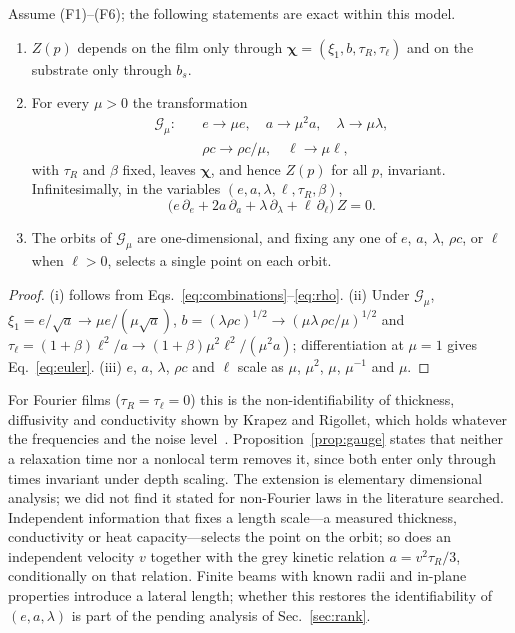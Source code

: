 \begin{proposition}\label{prop:gauge}
Assume (F1)--(F6); the following statements are exact within this model.
\begin{enumerate}
\item[(i)] $Z(p)$ depends on the film only through $\bm\chi=(\xi_1,b,\tau_R,\tau_\ell)$ and on the
substrate only through $b_s$.
\item[(ii)] For every $\mu>0$ the transformation
\begin{equation}
\begin{aligned}
\mathcal G_\mu:\quad &e\to\mu e,\quad a\to\mu^2a,\quad \lambda\to\mu\lambda,\\
&\rho c\to\rho c/\mu,\quad \ell\to\mu\ell,
\end{aligned}
\label{eq:gaugegroup}
\end{equation}
with $\tau_R$ and $\beta$ fixed, leaves $\bm\chi$, and hence $Z(p)$ for all $p$, invariant.
Infinitesimally, in the variables $(e,a,\lambda,\ell,\tau_R,\beta)$,
\begin{equation}
\big(e\,\partial_e+2a\,\partial_a+\lambda\,\partial_\lambda+\ell\,\partial_\ell\big)\,Z=0 .
\label{eq:euler}
\end{equation}
\item[(iii)] The orbits of $\mathcal G_\mu$ are one-dimensional, and fixing any one of $e$, $a$,
$\lambda$, $\rho c$, or $\ell$ when $\ell>0$, selects a single point on each orbit.
\end{enumerate}
\end{proposition}

\begin{proof}
(i) follows from Eqs.~\eqref{eq:combinations}--\eqref{eq:rho}. (ii) Under $\mathcal G_\mu$,
$\xi_1=e/\sqrt a\to\mu e/(\mu\sqrt a)$, $b=(\lambda\rho c)^{1/2}\to(\mu\lambda\,\rho c/\mu)^{1/2}$ and
$\tau_\ell=(1+\beta)\ell^2/a\to(1+\beta)\mu^2\ell^2/(\mu^2a)$; differentiation at $\mu=1$ gives
Eq.~\eqref{eq:euler}. (iii) $e$, $a$, $\lambda$, $\rho c$ and $\ell$ scale as $\mu$, $\mu^2$, $\mu$,
$\mu^{-1}$ and $\mu$.
\end{proof}

For Fourier films ($\tau_R=\tau_\ell=0$) this is the non-identifiability of thickness, diffusivity and
conductivity shown by Krapez and Rigollet, which holds whatever the frequencies and the noise
level~\cite{KrapezRigollet2017}. Proposition~\ref{prop:gauge} states that neither a relaxation time nor a
nonlocal term removes it, since both enter only through times invariant under depth scaling. The
extension is elementary dimensional analysis; we did not find it stated for non-Fourier laws in the
literature searched. Independent information that fixes a length scale---a measured thickness,
conductivity or heat capacity---selects the point on the orbit; so does an independent velocity $v$
together with the grey kinetic relation $a=v^2\tau_R/3$, conditionally on that relation. Finite beams
with known radii and in-plane properties introduce a lateral length; whether this restores the
identifiability of $(e,a,\lambda)$ is part of the pending analysis of Sec.~\ref{sec:rank}.

